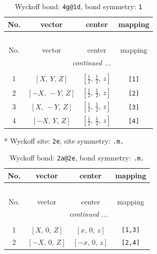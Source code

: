 \documentclass[fleqn,8pt]{jsarticle}
\begin{document}
\begin{longtable}{cccc}
\caption{Wyckoff bond: {\tt 4g@1d}, bond symmetry: {\tt 1}}
 \\
 \hline \hline
No. & vector & center & mapping \\ \hline \endfirsthead

\multicolumn{3}{l}{\tablename\ \thetable{}} \\
 \hline \hline
No. & vector & center & mapping \\ \hline \endhead

 \hline \hline
\multicolumn{3}{r}{\footnotesize\it continued ...} \\ \endfoot

 \hline \hline
\multicolumn{3}{r}{} \\ \endlastfoot

1 & $\left[ X,\, Y,\, Z \right]$ & $\left[ \frac{1}{2},\, \frac{1}{2},\, z \right]$ & {\tt [1]} \\ \hline
2 & $\left[ - X,\, - Y,\, Z \right]$ & $\left[ \frac{1}{2},\, \frac{1}{2},\, z \right]$ & {\tt [2]} \\ \hline
3 & $\left[ X,\, - Y,\, Z \right]$ & $\left[ \frac{1}{2},\, \frac{1}{2},\, z \right]$ & {\tt [3]} \\ \hline
4 & $\left[ - X,\, Y,\, Z \right]$ & $\left[ \frac{1}{2},\, \frac{1}{2},\, z \right]$ & {\tt [4]} \\
\end{longtable}
* Wyckoff site: {\tt 2e}, site symmetry: {\tt .m.}
\renewcommand{\arraystretch}{1.2}
\begin{longtable}{cccc}
\caption{Wyckoff bond: {\tt 2a@2e}, bond symmetry: {\tt .m.}}
 \\
 \hline \hline
No. & vector & center & mapping \\ \hline \endfirsthead

\multicolumn{3}{l}{\tablename\ \thetable{}} \\
 \hline \hline
No. & vector & center & mapping \\ \hline \endhead

 \hline \hline
\multicolumn{3}{r}{\footnotesize\it continued ...} \\ \endfoot

 \hline \hline
\multicolumn{3}{r}{} \\ \endlastfoot

1 & $\left[ X,\, 0,\, Z \right]$ & $\left[ x,\, 0,\, z \right]$ & {\tt [1,3]} \\ \hline
2 & $\left[ - X,\, 0,\, Z \right]$ & $\left[ - x,\, 0,\, z \right]$ & {\tt [2,4]} \\
\end{longtable}
\end{document}
